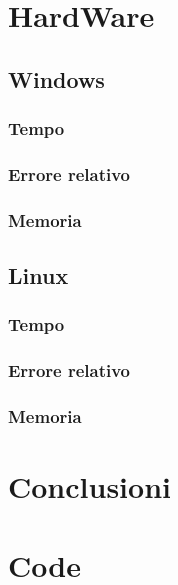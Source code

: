 \documentclass[12pt]{article}
\begin{document}
	
\section{HardWare}	
	\subsection{Windows}
		\subsubsection{Tempo}
		\subsubsection{Errore relativo}
		\subsubsection{Memoria}
	\subsection{Linux}
		\subsubsection{Tempo}
		\subsubsection{Errore relativo}
		\subsubsection{Memoria}
\section{Conclusioni}
\section{Code}
\end{document}
